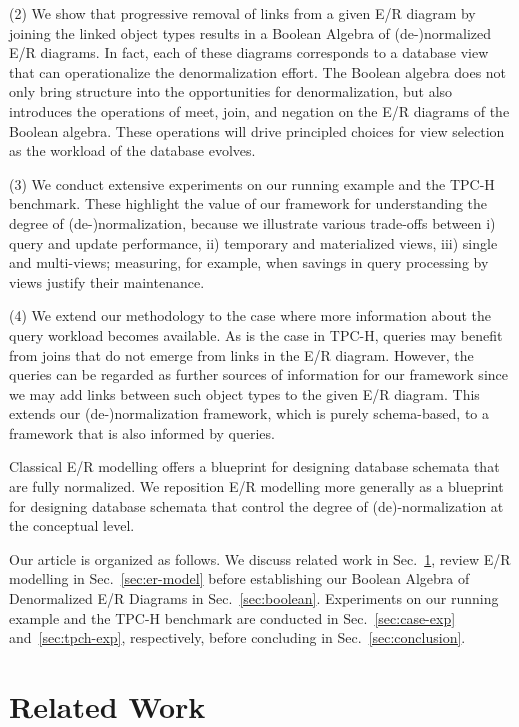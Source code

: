 \documentclass[sigconf]{acmart}
\begin{document}
(2) We show that progressive removal of links from a given E/R diagram by joining the linked object types results in a Boolean Algebra of (de-)normalized E/R diagrams. In fact, each of these diagrams corresponds to a database view that can operationalize the denormalization effort. The Boolean algebra does not only bring structure into the opportunities for denormalization, but also introduces the operations of meet, join, and negation on the E/R diagrams of the Boolean algebra. These operations will drive principled choices for view selection as the workload of the database evolves.

(3) We conduct extensive experiments on our running example and the TPC-H benchmark. These highlight the value of our framework for understanding the degree of (de-)normalization, because we illustrate various trade-offs between i) query and update performance, ii) temporary and materialized views, iii) single and multi-views; measuring, for example, when savings in query processing by views justify their maintenance.

(4) We extend our methodology to the case where more information about the query workload becomes available. As is the case in TPC-H, queries may benefit from joins that do not emerge from links in the E/R diagram. However, the queries can be regarded as further sources of information for our framework since we may add links between such object types to the given E/R diagram. This extends our (de-)normalization framework, which is purely schema-based, to a framework that is also informed by queries.

Classical E/R modelling offers a blueprint for designing database schemata that are fully normalized. We reposition E/R modelling more generally as a blueprint for designing database schemata that control the degree of (de)-normalization at the conceptual level.

Our article is organized as follows. We discuss related work in Sec.~\ref{sec:related}, review E/R modelling in Sec.~\ref{sec:er-model} before establishing our Boolean Algebra of Denormalized E/R Diagrams in Sec.~\ref{sec:boolean}. Experiments on our running example and the TPC-H benchmark are conducted in Sec.~\ref{sec:case-exp} and~\ref{sec:tpch-exp}, respectively, before concluding in Sec.~\ref{sec:conclusion}.

\section{Related Work}\label{sec:related}
\end{document}
